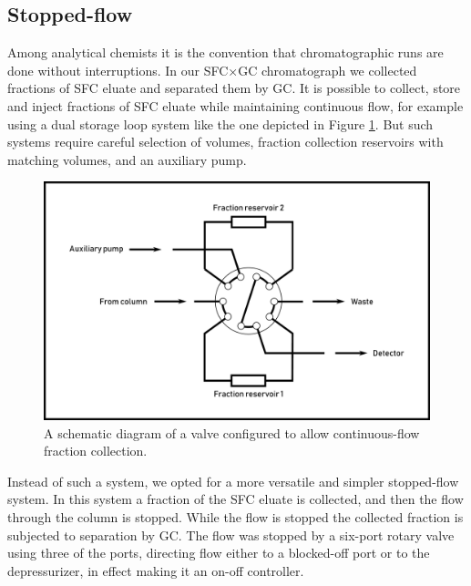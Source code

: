 \subsection{Stopped-flow}
\label{sec:stopflow}

Among analytical chemists it is the convention that chromatographic runs are
done without interruptions. In our SFC×GC chromatograph we collected fractions
of SFC eluate and separated them by GC. It is possible to collect, store and
inject fractions of SFC eluate while maintaining continuous flow, for example
using a dual storage loop system like the one depicted in Figure
\ref{fig:continuousflow}. But such systems require careful selection of volumes,
fraction collection reservoirs with matching volumes, and an auxiliary pump.

\begin{figure}
\centering
\includegraphics[width=\textwidth]{Figures/ContinuousFlowStopValve.pdf}
\decoRule

\caption[Schematic diagram of a continuous-flow valve.]{A schematic diagram of a
valve configured to allow continuous-flow fraction collection. }

\label{fig:continuousflow}
\end{figure}

Instead of such a system, we opted for a more versatile and simpler stopped-flow
system. In this system a fraction of the SFC eluate is collected, and then the
flow through the column is stopped. While the flow is stopped the collected
fraction is subjected to separation by GC. The flow was stopped by a six-port
rotary valve using three of the ports, directing flow either to a blocked-off
port or to the depressurizer, in effect making it an on-off controller.

